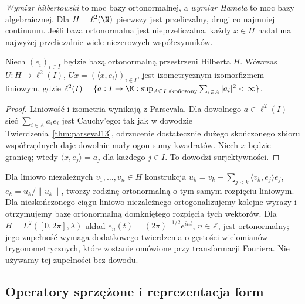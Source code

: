 \begin{uwaga}
\label{rem:hamel-vs-hilbert13}
\emph{Wymiar hilbertowski} to moc bazy ortonormalnej,
a \emph{wymiar Hamela} to moc bazy algebraicznej.
Dla $H=\ell^2(\N)$ pierwszy jest przeliczalny, drugi
co najmniej continuum. Jeśli baza ortonormalna jest
nieprzeliczalna, każdy $x\in H$ nadal ma najwyżej
przeliczalnie wiele niezerowych współczynników.
\end{uwaga}

\begin{stwierdzenie}
\label{prop:hilbert-l2I13}
Niech $(e_i)_{i\in I}$ będzie bazą ortonormalną przestrzeni
Hilberta $H$. Wówczas $U:H\to\ell^2(I)$,
$Ux=(\langle x,e_i\rangle)_{i\in I}$, jest izometrycznym
izomorfizmem liniowym, gdzie
$\ell^2(I)=\{a:I\to\K:\sup_{A\subseteq I\text{ skończony}}
\sum_{i\in A}|a_i|^2<\infty\}$.
\end{stwierdzenie}
\begin{proof}
Liniowość i izometria wynikają z Parsevala. Dla dowolnego
$a\in\ell^2(I)$ sieć $\sum_{i\in A}a_ie_i$ jest Cauchy'ego:
tak jak w dowodzie Twierdzenia~\ref{thm:parseval13},
odrzucenie dostatecznie dużego skończonego zbioru współrzędnych
daje dowolnie mały ogon sumy kwadratów. Niech $x$ będzie granicą;
wtedy $\langle x,e_j\rangle=a_j$ dla każdego $j\in I$.
To dowodzi surjektywności.
\end{proof}

\begin{przyklad}
\label{ex:gram-schmidt13}
Dla liniowo niezależnych $v_1,\ldots,v_n\in H$ konstrukcja
$u_k=v_k-\sum_{j<k}\langle v_k,e_j\rangle e_j$,
$e_k=u_k/\|u_k\|$, tworzy rodzinę ortonormalną o tym samym
rozpięciu liniowym. Dla nieskończonego ciągu liniowo niezależnego
ortogonalizujemy kolejne wyrazy i otrzymujemy bazę ortonormalną domkniętego rozpięcia tych wektorów. Dla $H=L^2([0,2\pi],\lambda)$
układ $e_n(t)=(2\pi)^{-1/2}e^{int}$, $n\in\mathbb Z$, jest
ortonormalny; jego zupełność wymaga dodatkowego twierdzenia
o gęstości wielomianów trygonometrycznych, które zostanie
omówione przy transformacji Fouriera. Nie używamy tej zupełności
bez dowodu.
\end{przyklad}

\subsection{Operatory sprzężone i reprezentacja form}

